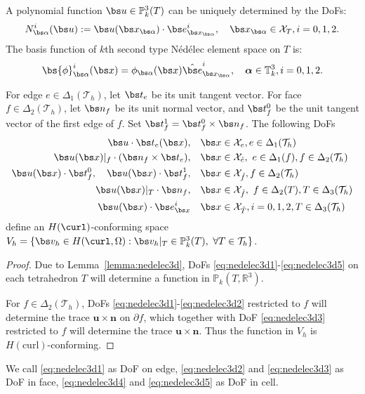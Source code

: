 \begin{lemma}\label{lemma:nedelec3d}
   A polynomial function $\bs u \in \mathbb P_k^3(T)$ 
   can be uniquely determined by the DoFs:
   $$
  N^i_{\bs \alpha }(\bs u):=   \bs u(\bs x_{\bs \alpha}) \cdot \bs e_{\bs x_{\bs \alpha}}^i, \quad \bs x_{\bs \alpha} \in \mathcal X_{T}, 
   i = 0, 1, 2.
   $$
   The basis function of $k$th second type N\'ed\'elec element space on $T$ is:
   $$
   \label{eq:nedelecbasis3d}
   \bs{\phi}_{\bs \alpha}^i(\bs x) = 
   \phi_{\bs\alpha}(\bs x) \hat{\bs e}_{\bs x_{\bs \alpha}}^i, \quad 
   \boldsymbol \alpha \in \mathbb T^3_k, i = 0, 1, 2.
   $$
 \end{lemma}

 \begin{lemma}
 For edge $e \in \Delta_1(\mathcal T_h)$, let $\bs t_e$ be its unit tangent vector.
 For face $f \in \Delta_2(\mathcal T_h)$, let $\bs n_f$ be its unit normal vector, and $\bs t_f^0$ be the unit tangent vector of 
 the first edge of $f$. Set $\bs t_f^1 = \bs t_f^0 \times \bs n_f$. The following {\rm DoFs}
 \begin{align}
   \bs u \cdot \bs t_e(\bs x), \quad & 
   \bs x \in \mathcal X_{e}, e \in \Delta_1(\mathcal T_h) \label{eq:nedelec3d1}\\
   \bs u(\bs x)|_f \cdot (\bs n_f \times \bs t_e), \quad & 
   \bs x \in \mathcal X_{\mathring{e}}, \ e \in \Delta_1(f), f \in 
   \Delta_2(\mathcal T_h) \label{eq:nedelec3d2}\\
   \bs u(\bs x) \cdot \bs t_{f}^0, \quad 
   \bs u(\bs x) \cdot \bs t_f^1, \quad &  
   \bs x \in \mathcal X_{\mathring{f}}, f \in \Delta_2(\mathcal T_h)\label{eq:nedelec3d3}\\
   \bs u(\bs x)|_{T} \cdot \bs n_f, \quad & 
   \bs x \in \mathcal X_{\mathring{f}}, \ f \in \Delta_2(T), 
   T \in \Delta_3(\mathcal T_h)\label{eq:nedelec3d4}\\
   \bs u(\bs x) \cdot \bs e_{\bs x}^i \quad & 
   \bs x \in \mathcal X_{\mathring{T}}, i=0,1,2, T \in \Delta_3(\mathcal T_h)\label{eq:nedelec3d5}
 \end{align}
 define an $H(\curl)$-conforming space 
 $V_h=\{\bs v_h\in H(\curl, \Omega): \bs v_h|_{T}\in\mathbb P_k^3(T),\ 
 \forall T\in\mathcal T_h\}$.
 \end{lemma}
 \begin{proof}
 Due to Lemma~\ref{lemma:nedelec3d},
 DoFs \eqref{eq:nedelec3d1}-\eqref{eq:nedelec3d5} on each tetrahedron $T$ will determine a 
 function in $\mathbb P_k(T, \mathbb R^3)$. 

 For $f \in \Delta_{2}(\mathcal T_h)$, DoFs \eqref{eq:nedelec3d1}-\eqref{eq:nedelec3d2} restricted to $f$ will determine the trace $\boldsymbol{u}\times\boldsymbol{n}$ on $\partial f$, which together with DoF \eqref{eq:nedelec3d3} restricted to $f$ will determine the trace $\boldsymbol{u}\times\boldsymbol{n}$. Thus the function in $V_h$ is 
 $H(\mathrm{curl})$-conforming.
 \end{proof}
 We call \eqref{eq:nedelec3d1} as DoF on edge,
 \eqref{eq:nedelec3d2} and \eqref{eq:nedelec3d3} as DoF in face,
 \eqref{eq:nedelec3d4} and \eqref{eq:nedelec3d5} as DoF in cell.
\LC{Correct equation number}
 



